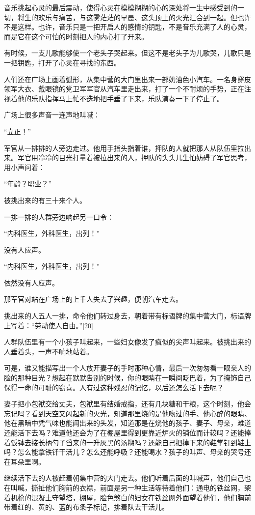 音乐挑起心灵的最后震动，使得心灵在模模糊糊的心的深处将一生中感受到的一切，将生的欢乐与痛苦，与这雾茫茫的早晨、这头顶上的火光汇合到一起。但也许不是这样。也许，音乐只是一把开启人的感情的钥匙，不是音乐充满了人的心灵，而是它在这个可怕的时刻把人的内心打了开来。

有时候，一支儿歌能够使一个老头子哭起来。但这不是老头子为儿歌哭，儿歌只是一把钥匙，打开了心灵在寻找的东西。

人们还在广场上画着弧形，从集中营的大门里出来一部奶油色小汽车。一名身穿皮领军大衣、戴眼镜的党卫军军官从汽车里走出来，打了一个不耐烦的手势，正在注视着他的乐队指挥马上忙不迭地把手垂了下来，乐队演奏一下子停止了。

广场上很多声音一连声地叫喊：

“立正！”

军官从一排排的人旁边走过。他用手指头指着谁，押队的人就把那人从队伍里拉出来。军官用冷冷的目光打量着被拉出来的人，押队的头头儿生怕妨碍了军官思考，用小声问着：

“年龄？职业？”

被挑出来的有三十来个人。

一排一排的人群旁边响起另一口令：

“内科医生，外科医生，出列！”

没有人应声。

“内科医生，外科医生，出列！”

依然没有人应声。

那军官对站在广场上的上千人失去了兴趣，便朝汽车走去。

挑出来的人五人一排，命令他们转过身去，朝着带有标语牌的集中营大门，标语牌上写着：“劳动使人自由。”[20]

人群队伍里有一个小孩子叫起来，一些妇女像发了疯似的尖声叫起来。被挑出来的人垂着头，一声不响地站着。

可是，谁又能描写出一个人放开妻子的手时那种心情，最后一次匆匆看一眼亲人的脸的那种目光？想起在默默吿别的时候，你的眼睛在一瞬间眨巴着，为了掩饰自己保得一命的可耻的窃喜。人有过这种残忍的记忆，以后还怎么活下去呢？

妻子把小包袱交给丈夫，包袱里有结婚戒指，还有几块糖和干粮，这个时刻，他会忘记吗？看到天空又闪起新的火光，知道那里烧的是他吻过的手、他心醉的眼睛、他在黑暗中凭气味也能闻出来的头发，知道那是在烧他的孩子、妻子、母亲，难道还能活下去吗？难道他还会为了在棚屋里得到更靠近炉火的铺位而计较吗？还能捧着饭钵去接长柄勺子舀来的一升灰黑的汤糊吗？还能自己把掉下来的鞋掌钉到鞋上吗？怎么能拿铁钎干活儿？怎么还能呼吸？还能喝水？孩子的叫声、母亲的哭号还在耳朵里啊。

继续活下去的人被赶着朝集中营的大门走去。他们听着后面的叫喊声，他们自己也在叫喊，撕扯他们胸前的衣襟，前面是另一种生活等待着他们：通电的铁丝网，架着机枪的混凝土守望塔，棚屋，脸色煞白的妇女在铁丝网外面望着他们，他们胸前带着红的、黄的、蓝的布条子标记，排着队去干活儿。

